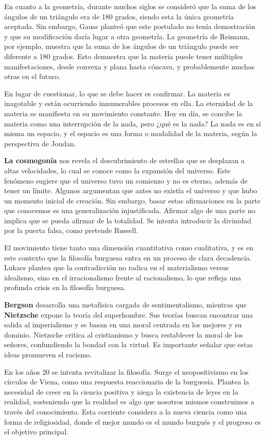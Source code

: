 \documentclass[
  a4paper,
]{article}
\begin{document}
En cuanto a la geometría, durante muchos siglos se consideró que la suma
de los ángulos de un triángulo era de 180 grados, siendo esta la única
geometría aceptada. Sin embargo, Gauss planteó que este postulado no
tenía demostración y que su modificación daría lugar a otra geometría.
La geometría de Reimann, por ejemplo, muestra que la suma de los ángulos
de un triángulo puede ser diferente a 180 grados. Esto demuestra que la
materia puede tener múltiples manifestaciones, desde convexa y plana
hasta cóncava, y probablemente muchas otras en el futuro.

En lugar de cuestionar, lo que se debe hacer es confirmar. La materia es
inagotable y están ocurriendo innumerables procesos en ella. La
eternidad de la materia se manifiesta en su movimiento constante. Hoy en
día, se concibe la materia como una interrupción de la nada, pero ¿qué
es la nada? La nada es en sí misma un espacio, y el espacio es una forma
o modalidad de la materia, según la perspectiva de Joudan.

\textbf{La cosmogonía} nos revela el descubrimiento de estrellas que se
desplazan a altas velocidades, lo cual se conoce como la expansión del
universo. Este fenómeno sugiere que el universo tuvo un comienzo y no es
eterno, además de tener un límite. Algunos argumentan que antes no
existía el universo y que hubo un momento inicial de creación. Sin
embargo, basar estas afirmaciones en la parte que conocemos es una
generalización injustificada. Afirmar algo de una parte no implica que
se pueda afirmar de la totalidad. Se intenta introducir la divinidad por
la puerta falsa, como pretende Russell.

El movimiento tiene tanto una dimensión cuantitativa como cualitativa, y
es en este contexto que la filosofía burguesa entra en un proceso de
clara decadencia. Lukacs plantea que la contradicción no radica en el
materialismo versus idealismo, sino en el irracionalismo frente al
racionalismo, lo que refleja una profunda crisis en la filosofía
burguesa.

\textbf{Bergson} desarrolla una metafísica cargada de sentimentalismo,
mientras que \textbf{Nietzsche} expone la teoría del superhombre. Sus
teorías buscan encontrar una salida al imperialismo y se basan en una
moral centrada en los mejores y su dominio. Nietzsche critica al
cristianismo y busca restablecer la moral de los señores, confundiendo
la bondad con la virtud. Es importante señalar que estas ideas promueven
el racismo.

En los años 20 se intenta revitalizar la filosofía. Surge el
neopositivismo en los círculos de Viena, como una respuesta reaccionaria
de la burguesía. Plantea la necesidad de creer en la ciencia positiva y
niega la existencia de leyes en la realidad, sosteniendo que la realidad
es algo que nosotros mismos construimos a través del conocimiento. Esta
corriente considera a la nueva ciencia como una forma de religiosidad,
donde el mejor mundo es el mundo burgués y el progreso es el objetivo
principal.
\end{document}
